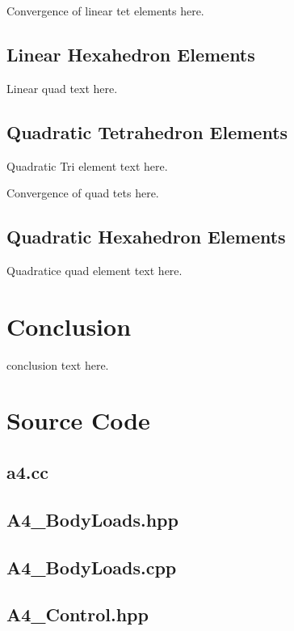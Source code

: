 \documentclass[a4paper, 12pt]{article}
\begin{document}
Convergence of linear tet elements here.

\subsection{Linear Hexahedron Elements} \label{subsec:linHex}
Linear quad text here.

\subsection{Quadratic Tetrahedron Elements} \label{subsec:quadTet}
Quadratic Tri element text here.

Convergence of quad tets here.

\subsection{Quadratic Hexahedron Elements} \label{subsec:quadHex}
Quadratice quad element text here.

\section{Conclusion} \label{sec:conclusion}
conclusion text here.

\newpage
\appendix
\section{Source Code} \label{sec:code}

\subsection{a4.cc} \label{subsec:a4.cc}


\subsection{A4\_BodyLoads.hpp} \label{subsec:BLhpp}


\subsection{A4\_BodyLoads.cpp} \label{subsec:BLcpp}


\subsection{A4\_Control.hpp} \label{subsec:Cont.hpp}

\end{document}
